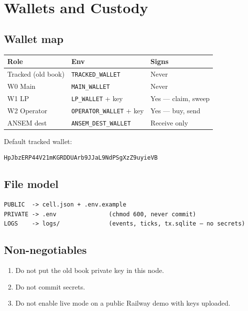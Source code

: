 \chapter{Wallets and Custody}

\section{Wallet map}

\begin{center}
\begin{tabular}{@{}lll@{}}
\toprule
Role & Env & Signs \\
\midrule
Tracked (old book) & \texttt{TRACKED\_WALLET} & Never \\
W0 Main & \texttt{MAIN\_WALLET} & Never \\
W1 LP & \texttt{LP\_WALLET} + key & Yes --- claim, sweep \\
W2 Operator & \texttt{OPERATOR\_WALLET} + key & Yes --- buy, send \\
ANSEM dest & \texttt{ANSEM\_DEST\_WALLET} & Receive only \\
\bottomrule
\end{tabular}
\end{center}

Default tracked wallet:
\begin{lstlisting}
HpJbzERP44V21mKGRDDUArb9JJaL9NdPSgXzZ9uyieVB
\end{lstlisting}

\section{File model}

\begin{lstlisting}
PUBLIC  -> cell.json + .env.example
PRIVATE -> .env               (chmod 600, never commit)
LOGS    -> logs/              (events, ticks, tx.sqlite — no secrets)
\end{lstlisting}

\section{Non-negotiables}

\begin{enumerate}
  \item Do not put the old book private key in this node.
  \item Do not commit secrets.
  \item Do not enable live mode on a public Railway demo with keys uploaded.
\end{enumerate}
